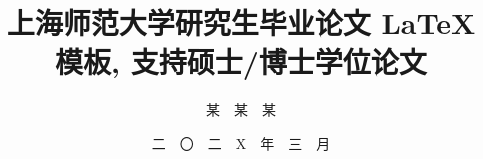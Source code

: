 \documentclass[master,fontset=ubuntu]{shnuthesis}
\title{上海师范大学研究生毕业论文 LaTeX 模板, 支持硕士/博士学位论文}
\author{某~~某~~某}   %
\date{二~~〇~~二~~X~~年~~三~~月 }  %
\institute{学~~院~~名~~称}  %
\begin{document}
\maketitle

\makestatement


\frontmatter






\maketoc

\makelof

\makelot





\mainmatter

















%






\backmatter %




\end{document}
